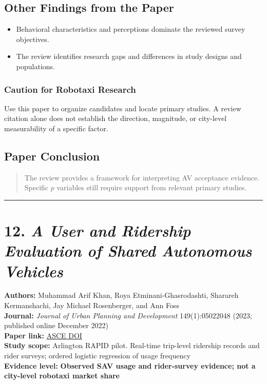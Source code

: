 \documentclass[10pt,a4paper]{article}
\providecommand{\tightlist}{\setlength{\itemsep}{0pt}\setlength{\parskip}{0pt}}
\begin{document}
\subsection{Other Findings from the Paper}

\begin{itemize}
\tightlist
\item
  Behavioral characteristics and perceptions dominate
  the reviewed survey objectives.
\item
  The review identifies research gaps and differences
  in study designs and populations.
\end{itemize}

\subsubsection{Caution for Robotaxi Research}

Use this paper to organize candidates and locate primary studies.
A review citation alone does not establish the direction,
magnitude, or city-level measurability of a specific factor.

\subsection{Paper Conclusion}

\begin{quote}
The review provides a framework for interpreting AV acceptance evidence.
Specific $p$ variables still require support from relevant primary studies.
\end{quote}


\begin{center}\rule{0.5\linewidth}{0.5pt}\end{center}

\hypertarget{a-user-and-ridership-evaluation-of-shared-autonomous-vehicles}{%
\section{\texorpdfstring{12. \emph{A User and Ridership Evaluation of Shared Autonomous Vehicles}}{12. A User and Ridership Evaluation of Shared Autonomous Vehicles}}\label{a-user-and-ridership-evaluation-of-shared-autonomous-vehicles}}

\textbf{Authors:} Muhammad Arif Khan, Roya Etminani-Ghasrodashti,
Sharareh Kermanshachi, Jay Michael Rosenberger, and Ann Foss\\
\textbf{Journal:} \emph{Journal of Urban Planning and Development}
149(1):05022048 (2023; published online December 2022)\\
\textbf{Paper link:}
\href{https://doi.org/10.1061/JUPDDM.UPENG-3945}{ASCE DOI}\\
\textbf{Study scope:} Arlington RAPID pilot.
Real-time trip-level ridership records and rider surveys;
ordered logistic regression of usage frequency\\
\textbf{Evidence level:}
\textbf{Observed SAV usage and rider-survey evidence;
not a city-level robotaxi market share}
\end{document}
